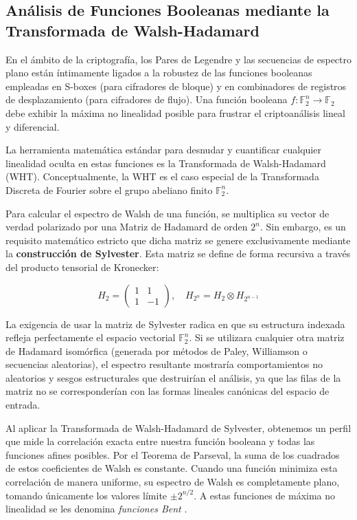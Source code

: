 \documentclass[12pt,a4paper]{tfg_domingo}
\begin{document}
\subsection{Análisis de Funciones Booleanas mediante la Transformada de Walsh-Hadamard}
En el ámbito de la criptografía, los Pares de Legendre y las secuencias de espectro plano están íntimamente ligados a la robustez de las funciones booleanas empleadas en S-boxes (para cifradores de bloque) y en combinadores de registros de desplazamiento (para cifradores de flujo). Una función booleana $f: \mathbb{F}_2^n \to \mathbb{F}_2$ debe exhibir la máxima no linealidad posible para frustrar el criptoanálisis lineal y diferencial.

La herramienta matemática estándar para desnudar y cuantificar cualquier linealidad oculta en estas funciones es la Transformada de Walsh-Hadamard (WHT). Conceptualmente, la WHT es el caso especial de la Transformada Discreta de Fourier sobre el grupo abeliano finito $\mathbb{F}_2^n$.

Para calcular el espectro de Walsh de una función, se multiplica su vector de verdad polarizado por una Matriz de Hadamard de orden $2^n$. Sin embargo, es un requisito matemático estricto que dicha matriz se genere exclusivamente mediante la \textbf{construcción de Sylvester}. Esta matriz se define de forma recursiva a través del producto tensorial de Kronecker:

$$ H_2 = \begin{pmatrix} 1 & 1 \\ 1 & -1 \end{pmatrix}, \quad H_{2^n} = H_2 \otimes H_{2^{n-1}} $$

La exigencia de usar la matriz de Sylvester radica en que su estructura indexada refleja perfectamente el espacio vectorial $\mathbb{F}_2^n$. Si se utilizara cualquier otra matriz de Hadamard isomórfica (generada por métodos de Paley, Williamson o secuencias aleatorias), el espectro resultante mostraría comportamientos no aleatorios y sesgos estructurales que destruirían el análisis, ya que las filas de la matriz no se corresponderían con las formas lineales canónicas del espacio de entrada.

Al aplicar la Transformada de Walsh-Hadamard de Sylvester, obtenemos un perfil que mide la correlación exacta entre nuestra función booleana y todas las funciones afines posibles. Por el Teorema de Parseval, la suma de los cuadrados de estos coeficientes de Walsh es constante. Cuando una función minimiza esta correlación de manera uniforme, su espectro de Walsh es completamente plano, tomando únicamente los valores límite $\pm 2^{n/2}$. A estas funciones de máxima no linealidad se les denomina \emph{funciones Bent} \cite{rothaus1976bent, pommerening2014fourier}.
\end{document}
